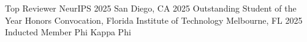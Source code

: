 


\begin{cvhonors}
\cvhonor
{Top Reviewer} %
{NeurIPS 2025} %
{San Diego, CA} %
{2025} %
\cvhonor
{Outstanding Student of the Year} %
{Honors Convocation, Florida Institute of Technology} %
{Melbourne, FL} %
{2025} %
\cvhonor
{Inducted Member} %
{Phi Kappa Phi} %
{} %
{} %
\end{cvhonors}
